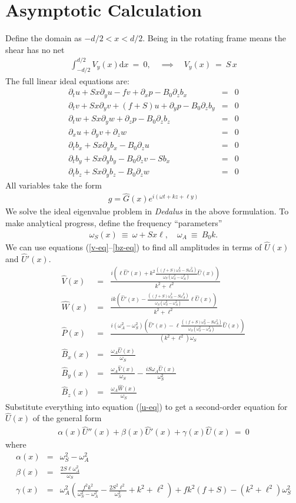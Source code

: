 \documentclass[aps,prl,preprint
,superscriptaddress]{revtex4-1}
\newcommand\Beq{\begin{eqnarray}}
\newcommand\Eeq{\end{eqnarray}}
\newcommand{\pd}[1]{\partial_{#1}}
\begin{document}
\section{Asymptotic Calculation}
\label{sec:asymp}
Define the domain as $ - d/2 < x < d/2$. Being in the rotating frame means the shear has no net
\Beq
\int_{-d/2}^{d/2} V_{y}(x) \text{d} x  \ = \ 0, \quad \implies  \quad V_{y}(x) \ = \ S\, x
\Eeq
The full linear ideal equations are:
\Beq\label{u-eq}
\pd{t} u + S x \pd{y} u - f v + \pd{x} p - B_{0} \pd{z} b_{x} &=& 0\\
\pd{t} v + S x \pd{y} v + (f+S) u + \pd{y} p - B_{0} \pd{z} b_{y} &=& 0\label{v-eq} \\
\pd{t} w + S x \pd{y} w + \pd{z} p - B_{0} \pd{z} b_{z} &=& 0 \\
\pd{x} u + \pd{y} v + \pd{z} w  &=& 0\\
\pd{t} b_{x} + S x \pd{y} b_{x} - B_{0} \pd{z} u &=& 0\\
\pd{t} b_{y} + S x \pd{y} b_{y} - B_{0} \pd{z} v - S b_{x}  &=& 0\\
\pd{t} b_{z} + S x \pd{y} b_{z} - B_{0} \pd{z} w &=& 0 \label{bz-eq}
\Eeq
All variables take the form
\Beq
g = \hat{G}(x) e^{ i ( \omega t + k z + \ell y ) } 
\Eeq
We solve the ideal eigenvalue problem in \textit{Dedalus} in the above formulation. To make analytical progress, define the frequency ``parameters'' 
\Beq
\omega_{S}(x) \ \equiv \ \omega + S x \ell, \quad \omega_{A}  \ \equiv \ B_{0} k.
\Eeq
We can use equations (\ref{v-eq}--\ref{bz-eq}) to find all amplitudes in terms of $\hat{U}(x)$ and $\hat{U}'(x)$. 
\Beq
\hat{V}(x) &=& \frac{i \left(\ell 
   \hat{U}'(x) + k^{2} \frac{ \left((f+S) \omega
   _S^2-S \omega _A^2\right)}{\omega _S
   \left(\omega _S^2-\omega _A^2\right)} \hat{U}(x)\right)}{k^2+\ell ^2} \\
\hat{W}(x) &=& \frac{i k \left(\hat{U}'(x)- \frac{ \left((f+S) \omega
   _S^2-S \omega _A^2\right)}{\omega _S
   \left(\omega _S^2-\omega _A^2\right)}  \ell 
   \hat{U}(x)\right)}{k^2+\ell ^2} \\
   \hat{P}(x) &=& \frac{i \left(\omega _A^2-\omega _S^2\right)
   \left(\hat{U}'(x) -  \ell \frac{ \left((f+S) \omega
   _S^2-S \omega _A^2\right)}{\omega _S
   \left(\omega _S^2-\omega _A^2\right)}
   \hat{U}(x)\right)}{\left(k^2+\ell ^2\right)
   \omega _S} \\
   \hat{B}_{x}(x) &=& \frac{\omega _A \hat{U}(x)}{\omega _S} \\
   \hat{B}_{y}(x) &=&\frac{\omega _A \hat{V}(x)}{\omega _S} -\frac{i S \omega _A \hat{U}(x)}{\omega _S^2} \\
   \hat{B}_{z}(x) &=& \frac{\omega _A \hat{W}(x)}{\omega _S}
   \Eeq
Substitute everything into equation (\ref{u-eq}) to get a second-order equation for $\hat{U}(x)$ of the general form 
\Beq
\alpha(x) \hat{U}''(x) + \beta(x) \hat{U}'(x) + \gamma(x) \hat{U}(x) \ = \ 0
\Eeq
where
\Beq
\alpha(x) &=& \omega _S^2-\omega _A^2 \\ 
   \beta(x) &=& \frac{2 S \ell  \omega _A^2}{\omega _S} \\
   \gamma(x) &=& \omega _A^2 \left(\frac{f^2 k^2}{\omega
   _S^2-\omega _A^2}-\frac{2 S^2 \ell
   ^2}{\omega _S^2}+k^2+\ell ^2\right)+f k^2
   (f+S)-\left(k^2+\ell ^2\right) \omega _S^2
\Eeq
\end{document}
